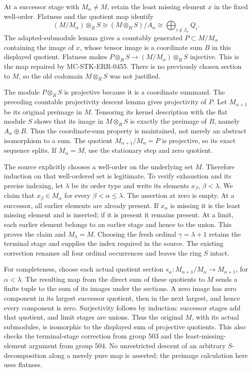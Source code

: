 At a successor stage with \(M_\alpha\ne M\), retain the least missing element \(x\) in the fixed well-order. Flatness and the quotient map identify \[
(M/M_\alpha)\otimes_R S
 \cong (M\otimes_R S)/A_\alpha
 \cong\bigoplus_{i\notin J_\alpha}Q_i .
\] The adapted-submodule lemma gives a countably generated \(P\subset M/M_\alpha\) containing the image of \(x\), whose tensor image is a coordinate sum \(B\) in this displayed quotient. Flatness makes \(P\otimes_R S\to(M/M_\alpha)\otimes_R S\) injective. This is the map repaired by MC-STK-ERR-0455. There is no previously chosen section to \(M\), so the old codomain \(M\otimes_R S\) was not justified.

The module \(P\otimes_R S\) is projective because it is a coordinate summand. The preceding countable projectivity descent lemma gives projectivity of \(P\). Let \(M_{\alpha+1}\) be its original preimage in \(M\). Tensoring its kernel description with the flat module \(S\) shows that its image in \(M\otimes_R S\) is exactly the preimage of \(B\), namely \(A_\alpha\oplus B\). Thus the coordinate-sum property is maintained, not merely an abstract isomorphism to a sum. The quotient \(M_{\alpha+1}/M_\alpha=P\) is projective, so its exact sequence splits. If \(M_\alpha=M\), use the stationary step and zero quotient.

The source explicitly chooses a well-order on the underlying set \(M\). Therefore induction on that well-ordered set is legitimate. To verify exhaustion and its precise indexing, let \(\lambda\) be its order type and write its elements \(x_\beta\), \(\beta<\lambda\). We claim that \(x_\beta\in M_\alpha\) for every \(\beta<\alpha\leq\lambda\). The assertion at zero is empty. At a successor, all earlier elements are already present. If \(x_\alpha\) is missing it is the least missing element and is inserted; if it is present it remains present. At a limit, each earlier element belongs to an earlier stage and hence to the union. This proves the claim and \(M_\lambda=M\). Choosing the fresh ordinal \(\gamma=\lambda+1\) retains the terminal stage and supplies the index required in the source. The existing correction renames all four ordinal occurrences and leaves the ring \(S\) intact.

For completeness, choose each actual quotient section \(s_\alpha:M_{\alpha+1}/M_\alpha\to M_{\alpha+1}\), for \(\alpha<\lambda\). The resulting map from the direct sum of these quotients to \(M\) sends a finite tuple to the sum of its images under the sections. A zero image has zero component in its largest successor quotient, then in the next largest, and hence every component is zero. Surjectivity follows by induction: successor stages add that quotient, and limit stages are unions. Thus the original \(M\), with its actual submodules, is isomorphic to the displayed sum of projective quotients. This also checks the terminal-stage correction from group 503 and the least-missing-element argument from group 504. No unrestricted descent of an arbitrary \(S\)-decomposition along a merely pure map is asserted; the preimage calculation here uses flatness.

